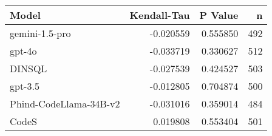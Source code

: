 \begin{tabular}{lrrr}
\toprule
Model & Kendall-Tau & P Value & n \\
\midrule
gemini-1.5-pro & -0.020559 & 0.555850 & 492 \\
gpt-4o & -0.033719 & 0.330627 & 512 \\
DINSQL & -0.027539 & 0.424527 & 503 \\
gpt-3.5 & -0.012805 & 0.704874 & 500 \\
Phind-CodeLlama-34B-v2 & -0.031016 & 0.359014 & 484 \\
CodeS & 0.019808 & 0.553404 & 501 \\
\bottomrule
\end{tabular}

